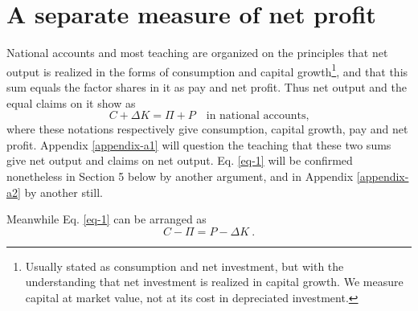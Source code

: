 \documentclass[a4paper,fleqn]{cas-sc}
\begin{document}
\section{A separate measure of net profit}

National accounts and most teaching are organized on the principles that net output is realized in the forms of consumption and capital growth\footnote{Usually stated as consumption and net investment, but with the understanding that net investment is realized in capital growth. We measure capital at market value, not at its cost in depreciated investment.}, and that this sum equals the factor shares in it as pay and net profit. Thus net output and the equal claims on it show as
\begin{equation}
    C + \Delta K = \Pi + P \quad \text{in national accounts,} \label{eq-1}
\end{equation}
where these notations respectively give consumption, capital growth, pay and net profit. Appendix \ref{appendix-a1} will question the teaching that these two sums give net output and claims on net output. Eq. \eqref{eq-1} will be confirmed nonetheless in Section 5 below by another argument, and in Appendix \ref{appendix-a2} by another still.

Meanwhile Eq. \eqref{eq-1} can be arranged as
\begin{equation}
    C - \Pi = P - \Delta K \ . \label{eq-2}
\end{equation}
\end{document}
